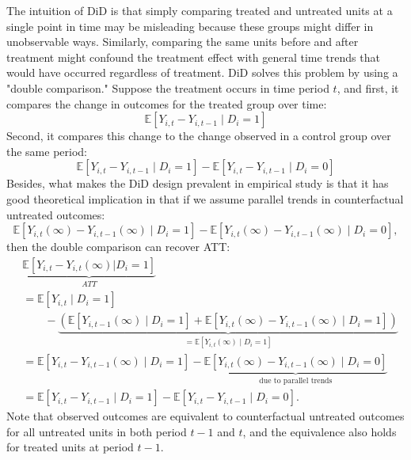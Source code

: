 The intuition of DiD is that simply comparing treated and untreated units at a single point in time may be misleading because these groups might differ in unobservable ways. Similarly, comparing the same units before and after treatment might confound the treatment effect with general time trends that would have occurred regardless of treatment.
DiD solves this problem by using a "double comparison." Suppose the treatment occurs in time period \( t \), and first, it compares the change in outcomes for the treated group over time:
\[
\mathbb{E}[Y_{i, t} - Y_{i, t-1} \mid D_i = 1]
\]
Second, it compares this change to the change observed in a control group over the same period:
\[
\mathbb{E}[Y_{i, t} - Y_{i, t-1} \mid D_i = 1]
-
\mathbb{E}[Y_{i, t} - Y_{i, t-1} \mid D_i = 0]
\]
Besides, what makes the DiD design prevalent in empirical study is that it has good theoretical implication in that if we assume parallel trends in counterfactual untreated outcomes:
\[
\mathbb{E}[Y_{i, t}(\infty) - Y_{i, t-1}(\infty) \mid D_i = 1]
-
\mathbb{E}[Y_{i, t}(\infty) - Y_{i, t-1}(\infty) \mid D_i = 0],
\]
then the double comparison can recover ATT:
\begin{align*}
&\underbrace{
    \mathbb{E}[Y_{i, t} - Y_{i, t}(\infty) | D_i = 1]
}_{
    ATT
}
\\
&
=
\mathbb{E}[
    Y_{i, t}
    \mid D_i = 1
]
\\
&\quad\quad
-
\underbrace{
    (
    \mathbb{E}[Y_{i, t-1}(\infty) \mid D_i = 1]
    +
    \mathbb{E}[Y_{i, t}(\infty)
        - Y_{i, t-1}(\infty) \mid D_i = 1]
    )
}_{
    =\mathbb{E}[Y_{i, t}(\infty) \mid D_i = 1]
}
\\
&=
\mathbb{E}[Y_{i, t} - Y_{i, t-1}(\infty) \mid D_i = 1]
-
\underbrace{\mathbb{E}[Y_{i, t}(\infty) - Y_{i, t-1}(\infty) \mid D_i = 0]}_{\text{due to parallel trends}}
\\
&=
\mathbb{E}[Y_{i, t} - Y_{i, t-1} \mid D_i = 1]
-
\mathbb{E}[Y_{i, t} - Y_{i, t-1} \mid D_i = 0].
\end{align*}
Note that observed outcomes are equivalent to counterfactual untreated outcomes for all untreated units in both period $t-1$ and $t$, and the equivalence also holds for treated units at period $t-1$.

